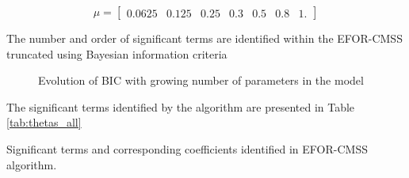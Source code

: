 \documentclass[a4paper,11pt,twoside]{article}
\theoremstyle{mytheoremstyle}
\begin{document}
\begin{equation*}
\mu = \left[\begin{array}{ccccccc}0.0625 & 0.125 & 0.25 & 0.3 & 0.5 & 0.8 & 1.
\end{array}\right]
\end{equation*}
\par The number and order of significant terms are identified within the EFOR-CMSS truncated using Bayesian information criteria 
\begin{figure}[!h]
	\centering
	
	\caption{Evolution of BIC with growing number of parameters in the model}\label{fig:bic}
\end{figure}	
\par The significant terms identified by the algorithm are presented in Table \ref{tab:thetas_all}
\begin{table}[!h]
	\centering
	\caption{Significant terms and corresponding coefficients identified in EFOR-CMSS algorithm.}\label{tab:theetas_all}
	\small
	
\end{table} 
\end{document}
